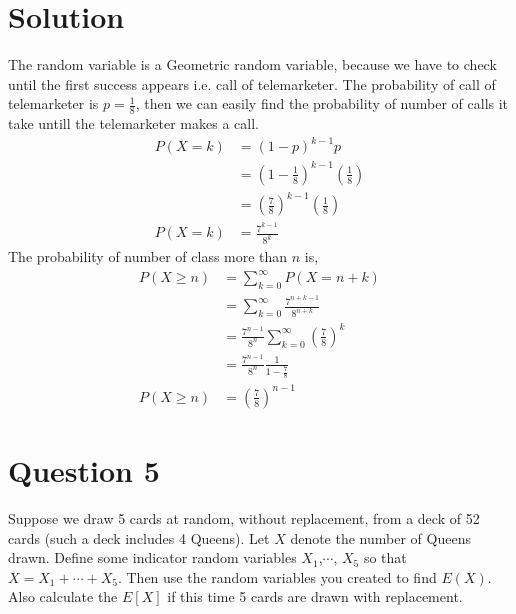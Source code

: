 \documentclass[a4paper, 11pt]{article}
\begin{document}
\section*{Solution}
The random variable is a Geometric random variable, because we have to check until the first success appears i.e. call of telemarketer. The probability of call of telemarketer is $p=\frac{1}{8}$, then we can easily find the probability of number of calls it take untill the telemarketer makes a call.
\begin{equation*}
    \begin{split}
        P(X=k)&=\left(1-p\right)^{k-1}p\\
        &=\left(1-\frac{1}{8}\right)^{k-1}\left(\frac{1}{8}\right)\\
        &=\left(\frac{7}{8}\right)^{k-1}\left(\frac{1}{8}\right)\\
        P(X=k)&=\frac{7^{k-1}}{8^{k}}
    \end{split}
\end{equation*}
The probability of number of class more than $n$ is,
\begin{equation*}
    \begin{split}
        P(X\ge n)&=\sum_{k=0}^{\infty}P(X=n+k)\\
        &=\sum_{k=0}^{\infty}\frac{7^{n+k-1}}{8^{n+k}}\\
        &=\frac{7^{n-1}}{8^{n}}\sum_{k=0}^{\infty}\left(\frac{7}{8}\right)^{k}\\
        &=\frac{7^{n-1}}{8^{n}}\frac{1}{1-\frac{7}{8}}\\
        P(X\ge n)&=\left(\frac{7}{8}\right)^{n-1}
    \end{split}
\end{equation*}

\break
\section*{Question 5} Suppose we draw 5 cards at random, without replacement, from a deck of 52 cards (such a deck includes 4 Queens). Let $X$ denote the number of Queens drawn. Define some indicator random variables $X_1$,$\cdots$, $X_5$ so that $X = X_1 +\cdots + X_5$. Then use the random variables you created to find $E(X)$. Also calculate the $E[X]$ if this time 5 cards are drawn with replacement.
\end{document}
